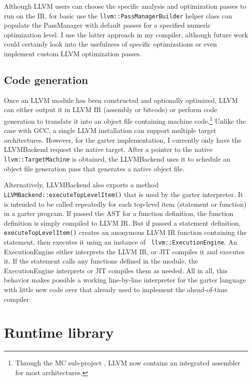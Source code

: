 \documentclass[11pt]{article}
\begin{document}
Although LLVM users can choose the specific analysis and optimization passes to
run on the IR, for basic use the {\tt llvm::PassManagerBuilder} helper class can
populate the PassManager with default passes for a specified numeric
optimization level.  I use the latter approach in my compiler, although future
work could certainly look into the usefulness of specific optimizations or even
implement custom LLVM optimization passes.

\subsection{Code generation}

Once an LLVM module has been constructed and optionally optimized, LLVM can
either output it in LLVM IR (assembly or bitcode) or perform code generation to
translate it into an object file containing machine code.\footnote{Through the
    MC sub-project \cite{mc}, LLVM now contains an integrated assembler for most
architectures.}  Unlike the case with GCC, a single LLVM installation can
support multiple target architectures.  However, for the garter implementation,
I currently only have the LLVMBackend request the native target.  After a
pointer to the native {\tt llvm::TargetMachine} is obtained, the LLVMBackend
uses it to schedule an object file generation pass that generates a native
object file.

Alternatively, LLVMBackend also exports a method {\tt
LLVMBackend::executeTopLevelItem()} that is used by the garter interpreter.  It
is intended to be called repeatedly for each top-level item (statement or
function) in a garter program.  If passed the AST for a function definition, the
function definition is simply compiled to LLVM IR.  But if passed a statement
definition, {\tt executeTopLevelItem()} creates an anonymous LLVM IR function
containing the statement, then executes it using an instance of {\tt
llvm::ExecutionEngine}.  An ExecutionEngine either interprets the LLVM IR, or
JIT compiles it and executes it.  If the statement calls any functions defined
in the module, the ExecutionEngine interprets or JIT compiles them as needed.
All in all, this behavior makes possible a working line-by-line interpreter for
the garter language with little new code over that already used to implement the
ahead-of-time compiler.

\section{Runtime library}
\end{document}
